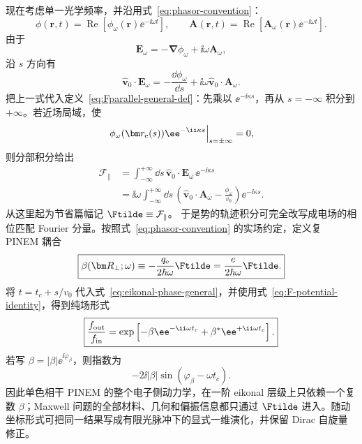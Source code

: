 现在考虑单一光学频率，并沿用式~\eqref{eq:phasor-convention}：
\begin{equation}
\phi(\bm r,t)=\operatorname{Re}[\phi_\omega(\bm r)\ee^{-\ii\omega t}],
\qquad
\bm A(\bm r,t)=\operatorname{Re}[\bm A_\omega(\bm r)\ee^{-\ii\omega t}].
\end{equation}
由于
\begin{equation}
\bm E_\omega=-\bm\nabla\phi_\omega+\ii\omega\bm A_\omega,
\label{eq:E-from-potentials-phasor}
\end{equation}
沿 $s$ 方向有
\begin{equation}
\hat{\bm v}_0\cdot\bm E_\omega
=-\frac{\dd\phi_\omega}{\dd s}
+\ii\omega\hat{\bm v}_0\cdot\bm A_\omega.
\end{equation}
把上一式代入定义~\eqref{eq:Fparallel-general-def}：先乘以 $\ee^{-\ii\kappa s}$，再从 $s=-\infty$ 积分到 $+\infty$。若近场局域，使
\begin{equation}
\left.\phi_\omega(\bm r_{\rm e}(s))\ee^{-\ii\kappa s}\right|_{s=\pm\infty}=0,
\label{eq:localized-potential-boundary}
\end{equation}
则分部积分给出
\begin{align}
\mathcal F_{\parallel}
&=\int_{-\infty}^{+\infty}\!\dd s\,
\hat{\bm v}_0\cdot\bm E_\omega\,
\ee^{-\ii\kappa s}\\
&=\ii\omega\int_{-\infty}^{+\infty}\!\dd s\,
\left(\hat{\bm v}_0\cdot\bm A_\omega-\frac{\phi_\omega}{v_0}\right)
\ee^{-\ii\kappa s}.
\label{eq:F-potential-identity}
\end{align}
从这里起为节省篇幅记 $\Ftilde\equiv\mathcal F_{\parallel}$。
于是势的轨迹积分可完全改写成电场的相位匹配 Fourier 分量。按照式~\eqref{eq:phasor-convention} 的实场约定，定义复 PINEM 耦合
\begin{equation}
\boxed{
\beta(\bm R_\perp;\omega)
\equiv-\frac{q_{\rm e}}{2\hbar\omega}\Ftilde
=\frac{e}{2\hbar\omega}\Ftilde.}
\label{eq:beta-standard}
\end{equation}
将 $t=t_c+s/v_0$ 代入式~\eqref{eq:eikonal-phase-general}，并使用式~\eqref{eq:F-potential-identity}，得到纯场形式
\begin{equation}
\boxed{
\frac{f_{\rm out}}{f_{\rm in}}
=\exp\left[-\beta\ee^{-\ii\omega t_c}
+\beta^*\ee^{+\ii\omega t_c}\right].}
\label{eq:universal-phase-beta}
\end{equation}
若写 $\beta=|\beta|\ee^{\ii\varphi_\beta}$，则指数为
\begin{equation}
-2\ii|\beta|\sin(\varphi_\beta-\omega t_c).
\end{equation}
因此单色相干 PINEM 的整个电子侧动力学，在一阶 eikonal 层级上只依赖一个复数 $\beta$；Maxwell 问题的全部材料、几何和偏振信息都只通过 $\Ftilde$ 进入。随动坐标形式可把同一结果写成有限光脉冲下的显式一维演化，并保留 Dirac 自旋量修正。



